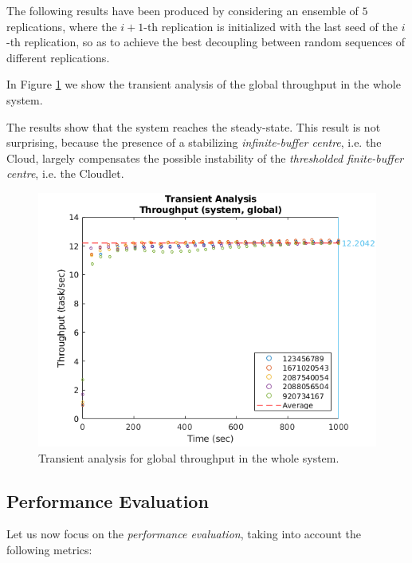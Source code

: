 The following results have been produced by considering an ensemble of $5$ replications, where the $i+1$-th replication is initialized with the last seed of the $i$-th replication, so as to achieve the best decoupling between random sequences of different replications.

In Figure \ref{fig:evaluation-transient-analysis-throughput} we show the transient analysis of the global throughput in the whole system.

The results show that the system reaches the steady-state.
This result is not surprising, because the presence of a stabilizing \textit{infinite-buffer centre}, i.e. the Cloud, largely compensates the possible instability of the \textit{thresholded finite-buffer centre}, i.e. the Cloudlet.

\begin{figure}
	\includegraphics[width=\columnwidth]{fig/evaluation-transient-analysis-throughput}
	\caption{Transient analysis for global throughput in the whole system.}
	\label{fig:evaluation-transient-analysis-throughput}
\end{figure}


\subsection{Performance Evaluation}
Let us now focus on the \textit{performance evaluation}, taking into account the following metrics:

